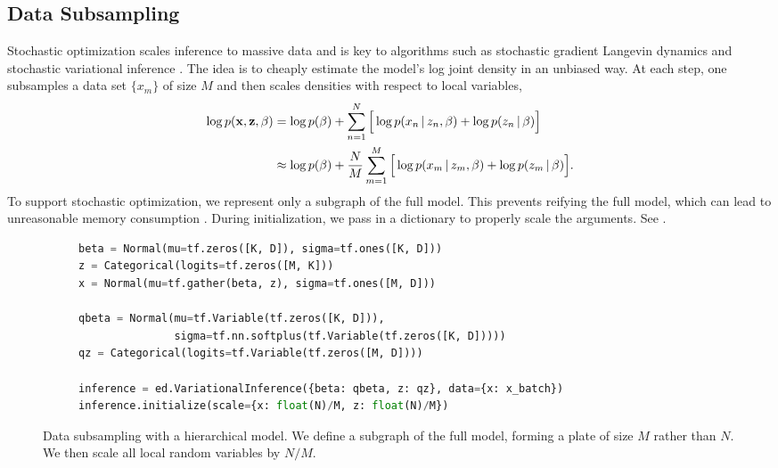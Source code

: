 \subsection{Data Subsampling}
\label{sub:batch_training}

Stochastic optimization \citep{bottou2010large} scales inference to
massive data and is key to
algorithms such as stochastic gradient Langevin dynamics
\citep{welling2011bayesian} and stochastic variational inference
\citep{hoffman2013stochastic}.  The idea is to cheaply estimate the
model's log joint density in an unbiased way.  At each step, one
subsamples a data set $\{x_m\}$ of size $M$ and then scales densities
with respect to local variables,
\begin{align*}
  \log p(\boldsymbol{\mathbf{x}}, \boldsymbol{\mathbf{z}}, \beta)
  & = \log p(\beta) +
  \sum_{n=1}^N\Big[\log p(x_n \,|\, z_n, \beta) + \log p(z_n \,|\, \beta)\Big]
  \\
  & \approx \log p(\beta) +
  \frac{N}{M}\sum_{m=1}^M\Big[\log p(x_m \,|\, z_m, \beta) + \log p(z_m \,|\, \beta)\Big].
\end{align*}
To support stochastic optimization, we represent only a subgraph of
the full model. This prevents reifying the full model, which can lead
to unreasonable memory consumption \citep{tristan2014augur}.  During
initialization, we pass in a dictionary to properly scale the
arguments. See .

\begin{figure}[!htb]
\begin{subfigure}{0.3\columnwidth}
  \centering
  
  \label{sub:hierachical_model_math}
\end{subfigure}%
\begin{subfigure}{0.6\columnwidth}
  \centering
\begin{lstlisting}[language=python]
beta = Normal(mu=tf.zeros([K, D]), sigma=tf.ones([K, D]))
z = Categorical(logits=tf.zeros([M, K]))
x = Normal(mu=tf.gather(beta, z), sigma=tf.ones([M, D]))

qbeta = Normal(mu=tf.Variable(tf.zeros([K, D])),
               sigma=tf.nn.softplus(tf.Variable(tf.zeros([K, D]))))
qz = Categorical(logits=tf.Variable(tf.zeros([M, D])))

inference = ed.VariationalInference({beta: qbeta, z: qz}, data={x: x_batch})
inference.initialize(scale={x: float(N)/M, z: float(N)/M})
\end{lstlisting}
  \label{sub:hierarchical_model_code}
\end{subfigure}
\caption{Data subsampling with a hierarchical model. We define a
subgraph of the full model, forming a plate of size $M$
rather than $N$. We then scale all local random variables by $N/M$.}
\label{fig:hierachical_model_batch}
\end{figure}

